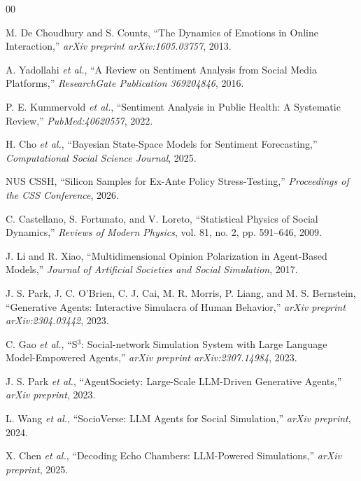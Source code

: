 \documentclass[12pt]{IEEEtran}
\begin{document}
\begin{thebibliography}{00}

M. De Choudhury and S. Counts, ``The Dynamics of Emotions in Online Interaction,'' \textit{arXiv preprint arXiv:1605.03757}, 2013.

A. Yadollahi \textit{et al.}, ``A Review on Sentiment Analysis from Social Media Platforms,'' \textit{ResearchGate Publication 369204846}, 2016.

P. E. Kummervold \textit{et al.}, ``Sentiment Analysis in Public Health: A Systematic Review,'' \textit{PubMed:40620557}, 2022.

H. Cho \textit{et al.}, ``Bayesian State-Space Models for Sentiment Forecasting,'' \textit{Computational Social Science Journal}, 2025.

NUS CSSH, ``Silicon Samples for Ex-Ante Policy Stress-Testing,'' \textit{Proceedings of the CSS Conference}, 2026.

C. Castellano, S. Fortunato, and V. Loreto, ``Statistical Physics of Social Dynamics,'' \textit{Reviews of Modern Physics}, vol. 81, no. 2, pp. 591--646, 2009.

J. Li and R. Xiao, ``Multidimensional Opinion Polarization in Agent-Based Models,'' \textit{Journal of Artificial Societies and Social Simulation}, 2017.

J. S. Park, J. C. O'Brien, C. J. Cai, M. R. Morris, P. Liang, and M. S. Bernstein, ``Generative Agents: Interactive Simulacra of Human Behavior,'' \textit{arXiv preprint arXiv:2304.03442}, 2023.

C. Gao \textit{et al.}, ``S$^3$: Social-network Simulation System with Large Language Model-Empowered Agents,'' \textit{arXiv preprint arXiv:2307.14984}, 2023.

J. S. Park \textit{et al.}, ``AgentSociety: Large-Scale LLM-Driven Generative Agents,'' \textit{arXiv preprint}, 2023.

L. Wang \textit{et al.}, ``SocioVerse: LLM Agents for Social Simulation,'' \textit{arXiv preprint}, 2024.

X. Chen \textit{et al.}, ``Decoding Echo Chambers: LLM-Powered Simulations,'' \textit{arXiv preprint}, 2025.


\end{thebibliography}
\end{document}
